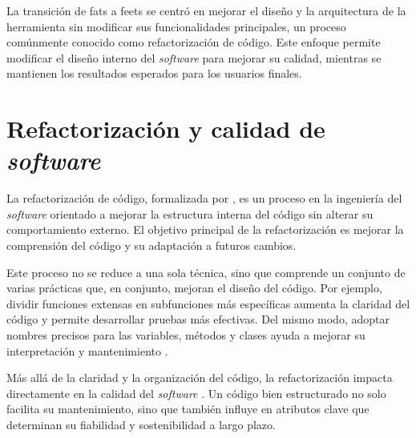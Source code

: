 La transición de \gls{fats} a \gls{feets} se centró en mejorar el diseño y la arquitectura de la herramienta sin modificar sus funcionalidades principales, un proceso comúnmente conocido como refactorización de código. Este enfoque permite modificar el diseño interno del \emph{software} para mejorar su calidad, mientras se mantienen los resultados esperados para los usuarios finales.

\section{Refactorización y calidad de \emph{software}}

La refactorización de código, formalizada por \citet{fowler1999refactoring}, es un proceso en la ingeniería del \emph{software} orientado a mejorar la estructura interna del código sin alterar su comportamiento externo. El objetivo principal de la refactorización es mejorar la comprensión del código y su adaptación a futuros cambios.

Este proceso no se reduce a una sola técnica, sino que comprende un conjunto de varias prácticas que, en conjunto, mejoran el diseño del código. Por ejemplo, dividir funciones extensas en subfunciones más específicas aumenta la claridad del código y permite desarrollar pruebas más efectivas. Del mismo modo, adoptar nombres precisos para las variables, métodos y clases ayuda a mejorar su interpretación y mantenimiento \citep{martin2009clean}.

Más allá de la claridad y la organización del código, la refactorización impacta directamente en la calidad del \emph{software} \citep{kaur2017qualityrefactoring}. Un código bien estructurado no solo facilita su mantenimiento, sino que también influye en atributos clave que determinan su fiabilidad y sostenibilidad a largo plazo.

